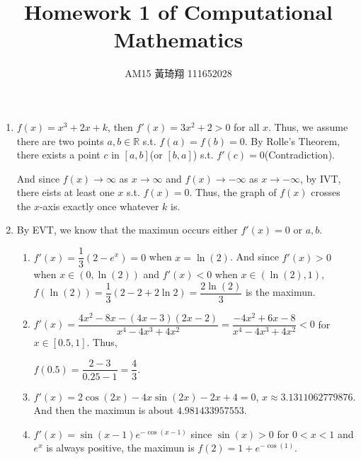 \documentclass[12pt]{article}
\title{Homework 1 of Computational Mathematics}
\author{AM15 黃琦翔 111652028}
\begin{document}
\maketitle
\begin{enumerate}
    \item $f(x) = x^3 + 2x + k$, then $f'(x) = 3x^2 + 2 > 0$ for all $x$.
    Thus, we assume there are two points $a, b \in \mathbb{R}$ s.t. $f(a) = f(b) = 0$.
    By Rolle's Theorem, there exists a point $c$ in $[a, b]$(or $[b, a]$) s.t. $f'(c) = 0$(Contradiction).

    And since $f(x) \to \infty$ as $x \to \infty$ and $f(x) \to -\infty$ as $x\to -\infty$,
    by IVT, there eists at least one $x$ s.t. $f(x) = 0$.
    Thus, the graph of $f(x)$ crosses the $x$-axis exactly once whatever $k$ is.

    \item By EVT, we know that the maximun occurs either $f'(x) = 0$ or $a, b$.\begin{enumerate}
        \item $f'(x) = \dfrac{1}{3}(2 - e^{x}) = 0$ when $x = \ln(2)$.
        And since $f'(x) > 0$ when $x \in (0, \ln(2))$ and $f'(x) < 0$ when $x\in (\ln(2), 1)$,
        $f(\ln(2)) = \dfrac{1}{3}(2-2+2\ln2) = \dfrac{2\ln(2)}{3}$ is the maximun.

        \item $f'(x) = \dfrac{4x^2 - 8x - (4x-3)(2x-2)}{x^4 - 4x^3 + 4x^2} = \dfrac{-4x^2 + 6x - 8}{x^4 - 4x^3 + 4x^2} < 0$ for $x \in [0.5, 1]$.
        Thus, 
        
        $f(0.5) = \dfrac{2-3}{0.25-1} = \dfrac{4}{3}$.

        \item $f'(x) = 2\cos(2x) - 4x\sin(2x) - 2x + 4 = 0$, $x \approx 3.1311062779876$.
        And then the maximun is about $4.981433957553$.

        \item $f'(x) = \sin(x-1)e^{-\cos(x-1)}$ since $\sin(x) > 0$ for $0 < x < 1$ and $e^{x}$ is always positive, 
        the maximun is $f(2) = 1 + e^{-\cos(1)}$.
    \end{enumerate}


\end{enumerate}
\end{document}
